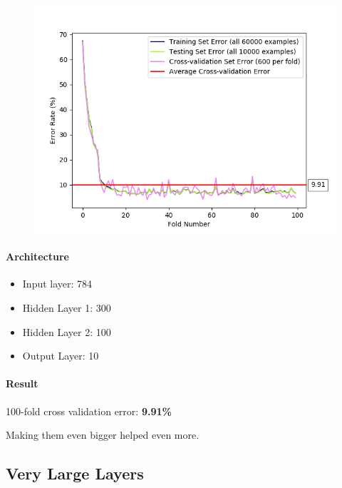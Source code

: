\documentclass[11pt]{article}
\makeatletter
\def\maxwidth{\ifdim\Gin@nat@width>\linewidth\linewidth
    \else\Gin@nat@width\fi}
\let\Oldincludegraphics\includegraphics
\renewcommand{\includegraphics}[1]{\Oldincludegraphics[width=.8\maxwidth]{#1}}
\providecommand{\tightlist}{%
      \setlength{\itemsep}{0pt}\setlength{\parskip}{0pt}}
\makeatother
\begin{document}
\begin{figure}[htbp]
\centering
\includegraphics{plots/ff-layersize-300-100.png}
\end{figure}

\paragraph{Architecture}\label{architecture-2}

\begin{itemize}
\tightlist
\item
  Input layer: 784
\item
  Hidden Layer 1: 300
\item
  Hidden Layer 2: 100
\item
  Output Layer: 10
\end{itemize}

\paragraph{Result}\label{result-2}

100-fold cross validation error: \textbf{9.91\%}

Making them even bigger helped even more.
\pagebreak

\subsection{Very Large Layers}\label{very-large-layers}
\end{document}
